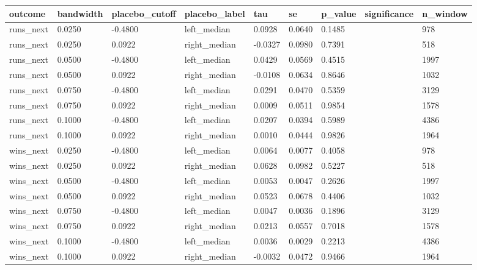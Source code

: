 \begin{tabular}{lllllllll}
\toprule
outcome & bandwidth & placebo\_cutoff & placebo\_label & tau & se & p\_value & significance & n\_window \\
\midrule
runs\_next & 0.0250 & -0.4800 & left\_median & 0.0928 & 0.0640 & 0.1485 &  & 978 \\
runs\_next & 0.0250 & 0.0922 & right\_median & -0.0327 & 0.0980 & 0.7391 &  & 518 \\
runs\_next & 0.0500 & -0.4800 & left\_median & 0.0429 & 0.0569 & 0.4515 &  & 1997 \\
runs\_next & 0.0500 & 0.0922 & right\_median & -0.0108 & 0.0634 & 0.8646 &  & 1032 \\
runs\_next & 0.0750 & -0.4800 & left\_median & 0.0291 & 0.0470 & 0.5359 &  & 3129 \\
runs\_next & 0.0750 & 0.0922 & right\_median & 0.0009 & 0.0511 & 0.9854 &  & 1578 \\
runs\_next & 0.1000 & -0.4800 & left\_median & 0.0207 & 0.0394 & 0.5989 &  & 4386 \\
runs\_next & 0.1000 & 0.0922 & right\_median & 0.0010 & 0.0444 & 0.9826 &  & 1964 \\
wins\_next & 0.0250 & -0.4800 & left\_median & 0.0064 & 0.0077 & 0.4058 &  & 978 \\
wins\_next & 0.0250 & 0.0922 & right\_median & 0.0628 & 0.0982 & 0.5227 &  & 518 \\
wins\_next & 0.0500 & -0.4800 & left\_median & 0.0053 & 0.0047 & 0.2626 &  & 1997 \\
wins\_next & 0.0500 & 0.0922 & right\_median & 0.0523 & 0.0678 & 0.4406 &  & 1032 \\
wins\_next & 0.0750 & -0.4800 & left\_median & 0.0047 & 0.0036 & 0.1896 &  & 3129 \\
wins\_next & 0.0750 & 0.0922 & right\_median & 0.0213 & 0.0557 & 0.7018 &  & 1578 \\
wins\_next & 0.1000 & -0.4800 & left\_median & 0.0036 & 0.0029 & 0.2213 &  & 4386 \\
wins\_next & 0.1000 & 0.0922 & right\_median & -0.0032 & 0.0472 & 0.9466 &  & 1964 \\
\bottomrule
\end{tabular}
